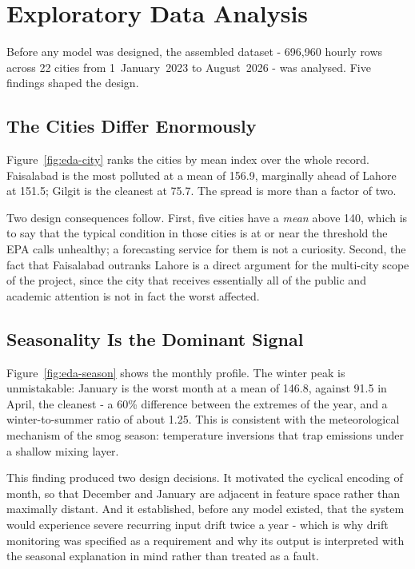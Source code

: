 \section{Exploratory Data Analysis}
\label{sec:design-eda}
Before any model was designed, the assembled dataset - 696,960 hourly rows
across 22 cities from 1~January~2023 to August~2026 - was analysed. Five
findings shaped the design.

\subsection{The Cities Differ Enormously}
Figure~\ref{fig:eda-city} ranks the cities by mean index over the whole record.
Faisalabad is the most polluted at a mean of 156.9, marginally ahead of Lahore at
151.5; Gilgit is the cleanest at 75.7. The spread is more than a factor of two.


Two design consequences follow. First, five cities have a \emph{mean} above 140,
which is to say that the typical condition in those cities is at or near the
threshold the EPA calls unhealthy; a forecasting service for them is not a
curiosity. Second, the fact that Faisalabad outranks Lahore is a direct argument
for the multi-city scope of the project, since the city that receives essentially
all of the public and academic attention is not in fact the worst affected.

\subsection{Seasonality Is the Dominant Signal}
Figure~\ref{fig:eda-season} shows the monthly profile. The winter peak is
unmistakable: January is the worst month at a mean of 146.8, against 91.5 in
April, the cleanest - a 60\% difference between the extremes of the year, and a
winter-to-summer ratio of about 1.25. This is consistent with the meteorological
mechanism of the smog season: temperature inversions that trap emissions under a
shallow mixing layer.


This finding produced two design decisions. It motivated the cyclical encoding of
month, so that December and January are adjacent in feature space rather than
maximally distant. And it established, before any model existed, that the system
would experience severe recurring input drift twice a year - which is why drift
monitoring was specified as a requirement and why its output is interpreted with
the seasonal explanation in mind rather than treated as a fault.

